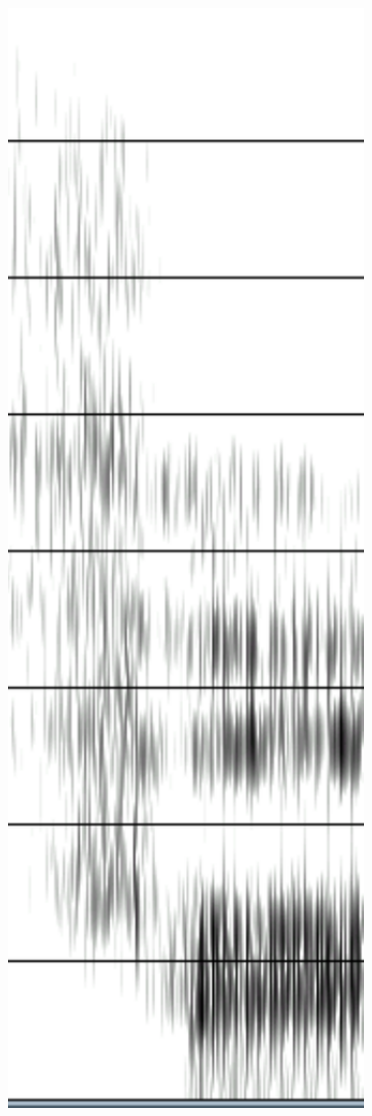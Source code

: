\documentclass[11pt]{book}
\begin{document}
 
 \begin{figure}
 \begin{center}
 \begin{minipage}[ct]{0.2\textwidth}
 
\includegraphics[width=1\textwidth]{grafiken/sprachsynthese/fa}

\end{minipage}
\end{center}
\end{figure}
\end{document}
